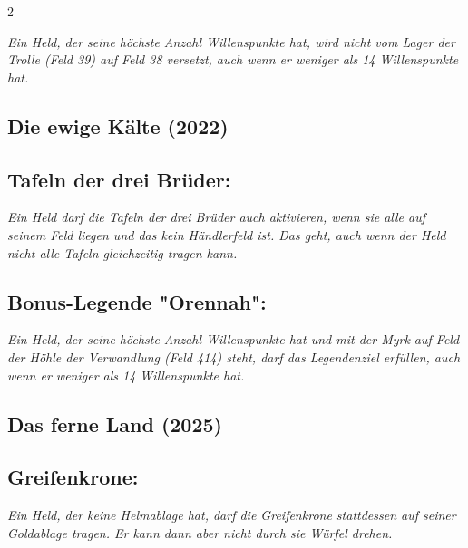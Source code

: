 \documentclass[10pt, a4paper, oneside]{book}
\newcommand{\fan}[1]{\textit{#1}}
\begin{document}
\begin{multicols*}{2}
\begin{bgcolor}[color-DZ]
\fan{Ein Held, der seine höchste Anzahl Willenspunkte hat, wird nicht vom Lager der Trolle (Feld 39) auf Feld 38 versetzt, auch wenn er weniger als 14 Willenspunkte hat.}

\end{bgcolor}



\begin{bgcolor}
\section{Die ewige Kälte (2022)}


\subsection{Tafeln der drei Brüder:}

\fan{Ein Held darf die Tafeln der drei Brüder auch aktivieren, wenn sie alle auf seinem Feld liegen und das kein Händlerfeld ist. Das geht, auch wenn der Held nicht alle Tafeln gleichzeitig tragen kann.}


\subsection{Bonus-Legende "Orennah":}

\fan{Ein Held, der seine höchste Anzahl Willenspunkte hat und mit der Myrk auf Feld der Höhle der Verwandlung (Feld 414) steht, darf das Legendenziel erfüllen, auch wenn er weniger als 14 Willenspunkte hat.}

\end{bgcolor}


\begin{bgcolor}
\section{Das ferne Land (2025)}



\subsection{Greifenkrone:}

\fan{Ein Held, der keine Helmablage hat, darf die Greifenkrone stattdessen auf seiner Goldablage tragen. Er kann dann aber nicht durch sie Würfel drehen.}

\end{bgcolor}



\end{multicols*}
\end{document}
